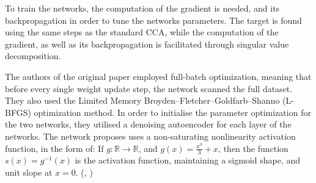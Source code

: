 {To train the networks, the computation of the gradient is needed, and its backpropagation in order to tune the networks parameters. The target is found using the same steps as the standard CCA, while the computation of the gradient, as well as its backpropagation is facilitated through singular value decomposition. 

The authors of the original paper employed full-batch optimization, meaning that before every single weight update step, the network scanned the full dataset. They also used the Limited Memory Broyden–Fletcher–Goldfarb–Shanno (L-BFGS) optimization method. In order to initialise the parameter optimization for the two networks, they utilised a denoising autoencoder for each layer of the networks. The network proposes uses a non-saturating nonlinearity activation function, in the form of:
If $g: \mathbb{R} \to \mathbb{R}$, and $g(x) = {\frac{x^3}{3}} + x$, then the function $s(x) = g^{-1}(x)$ is the activation function, maintaining a sigmoid shape, and unit slope at $x=0$. (\cite{43}, \cite{44})
}
